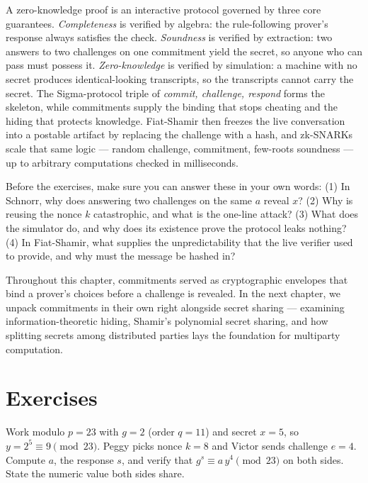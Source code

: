A zero-knowledge proof is an interactive protocol governed by three core guarantees. \emph{Completeness} is verified by algebra: the rule-following
prover's response always satisfies the check. \emph{Soundness} is verified by extraction:
two answers to two challenges on one commitment yield the secret, so anyone who
can pass must possess it. \emph{Zero-knowledge} is verified by simulation: a
machine with no secret produces identical-looking transcripts, so the
transcripts cannot carry the secret. The Sigma-protocol triple of
\emph{commit, challenge, respond} forms the skeleton, while commitments supply the
binding that stops cheating and the hiding that protects knowledge. Fiat-Shamir
then freezes the live conversation into a postable artifact by replacing the
challenge with a hash, and zk-SNARKs scale that same logic --- random challenge,
commitment, few-roots soundness --- up to arbitrary computations checked in
milliseconds.

\begin{recoverybox}
Before the exercises, make sure you can answer these in your own words:
(1) In Schnorr, why does answering two challenges on the same $a$ reveal $x$?
(2) Why is reusing the nonce $k$ catastrophic, and what is the one-line attack?
(3) What does the simulator do, and why does its existence prove the protocol
leaks nothing? (4) In Fiat-Shamir, what supplies the unpredictability that the
live verifier used to provide, and why must the message be hashed in?
\end{recoverybox}

Throughout this chapter, commitments served as cryptographic envelopes that bind a prover's choices before a challenge is revealed. In the next chapter, we unpack commitments in their own right alongside secret sharing --- examining information-theoretic hiding, Shamir's polynomial secret sharing, and how splitting secrets among distributed parties lays the foundation for multiparty computation.

\section*{Exercises}

\begin{exercise}
Work modulo $p = 23$ with $g = 2$ (order $q = 11$) and secret $x = 5$, so
$y = 2^{5} \equiv 9 \pmod{23}$. Peggy picks nonce $k = 8$ and Victor sends
challenge $e = 4$. Compute $a$, the response $s$, and verify that
$g^{s} \equiv a\,y^{4} \pmod{23}$ on both sides. State the numeric value both
sides share.
\end{exercise}

